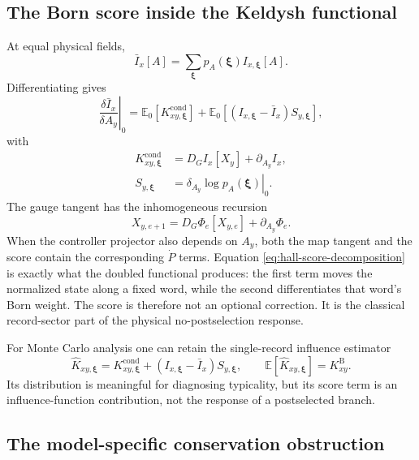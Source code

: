 \documentclass[aps,prb,onecolumn,nofootinbib,superscriptaddress]{revtex4-2}
\newcommand{\E}{\mathbb{E}}
\newcommand{\bxi}{\bm{\xi}}
\newcommand{\cond}{\mathrm{cond}}
\newcommand{\Born}{\mathrm{B}}
\begin{document}
\subsection{The Born score inside the Keldysh functional}

At equal physical fields,
\begin{equation}
  \bar I_x[A]=\sum_{\bxi}p_A(\bxi)I_{x,\bxi}[A].
\end{equation}
Differentiating gives
\begin{equation}
  \left.\frac{\delta\bar I_x}{\delta A_y}\right|_0
  =\E_0\!\left[ K^{\cond}_{xy,\bxi}\right]
   +\E_0\!\left[
     (I_{x,\bxi}-\bar I_x)S_{y,\bxi}
   \right],
  \label{eq:hall-score-decomposition}
\end{equation}
with
\begin{align}
  K^{\cond}_{xy,\bxi}
  &=D_GI_x[X_y]+\partial_{A_y}I_x,
  \label{eq:current-response}\\
  S_{y,\bxi}
  &=\left.\delta_{A_y}\log p_A(\bxi)\right|_0.
\end{align}
The gauge tangent has the inhomogeneous recursion
\begin{equation}
  X_{y,e+1}=D_G\Phi_e[X_{y,e}]+\partial_{A_y}\Phi_e.
  \label{eq:gauge-tangent}
\end{equation}
When the controller projector also depends on $A_y$, both the map tangent and
the score contain the corresponding $\dot P$ terms.  Equation
\eqref{eq:hall-score-decomposition} is exactly what the doubled functional
produces: the first term moves the normalized state along a fixed word, while
the second differentiates that word's Born weight.  The score is therefore not
an optional correction.  It is the classical record-sector part of the
physical no-postselection response.

For Monte Carlo analysis one can retain the single-record influence estimator
\begin{equation}
  \widehat K_{xy,\bxi}
  =K^{\cond}_{xy,\bxi}
   +(I_{x,\bxi}-\bar I_x)S_{y,\bxi},
  \qquad
  \E[\widehat K_{xy,\bxi}]=K^{\Born}_{xy}.
  \label{eq:hall-influence-estimator}
\end{equation}
Its distribution is meaningful for diagnosing typicality, but its score term
is an influence-function contribution, not the response of a postselected
branch.

\subsection{The model-specific conservation obstruction}
\end{document}
